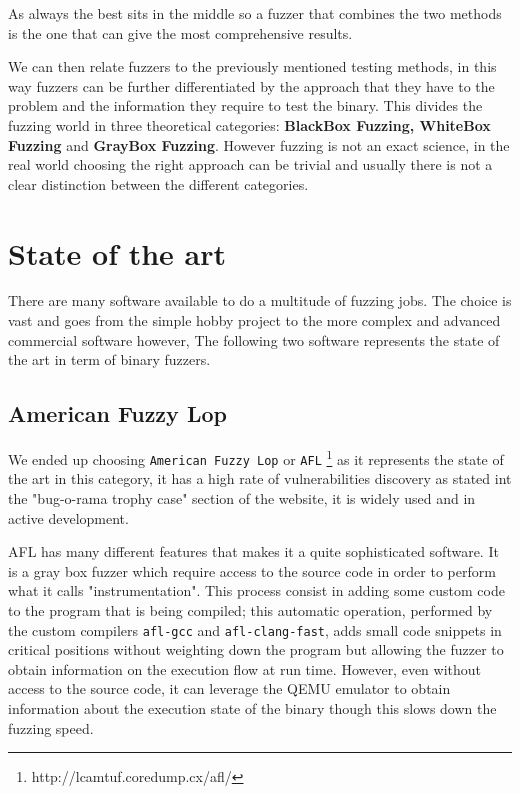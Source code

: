 \documentclass[../main.tex]{subfiles}
\begin{document}
As always the best sits in the middle so a fuzzer that combines the two methods is the one that can give the most comprehensive results.

We can then relate fuzzers to the previously mentioned testing methods, in this way fuzzers can be further differentiated by the approach that they have to
the problem and the information they require to test the binary. This divides
the fuzzing world in three theoretical categories: \textbf{BlackBox Fuzzing,
WhiteBox Fuzzing} and \textbf{GrayBox Fuzzing}. However fuzzing is not an exact
science, in the real world choosing the right approach can be trivial
and usually there is not a clear distinction between the different categories.


\section{State of the art}
There are many software available to do a multitude of fuzzing jobs. The choice is vast and goes from the simple hobby project to the more complex and advanced commercial software however,  The following two software represents the state of the art in term of binary fuzzers.


\subsection{American Fuzzy Lop}

We ended up choosing \texttt{American Fuzzy Lop} or \texttt{AFL}
\footnote{http://lcamtuf.coredump.cx/afl/} as it represents the state of the art
in this category, it has a high rate of vulnerabilities discovery as stated int
the "bug-o-rama trophy case" section of the website, it is widely used and in
active development.

AFL has many different features that makes it a quite sophisticated software. It
is a gray box fuzzer which require access to the source code in order to perform
what it calls "instrumentation". This process consist in adding some custom code
to the program that is being compiled; this automatic operation, performed by
the custom compilers \texttt{afl-gcc} and \texttt{afl-clang-fast}, adds small
code snippets in critical positions without weighting down the program but
allowing the fuzzer to obtain information on the execution flow at run time.
However, even without access to the source code, it can leverage the QEMU
emulator to obtain information about the execution state of the binary though
this slows down the fuzzing speed.
\end{document}
